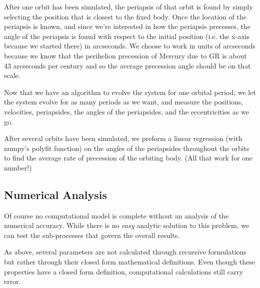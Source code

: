 \documentclass{report}
\begin{document}
            After one orbit has been simulated, the periapsis of that orbit is found by simply selecting the position that is closest to the fixed body.  Once the location of the periapsis is known, and since we're interested in how the periapsis precesses, the angle of the periapsis is found with respect to the initial position (i.e. the x-axis because we started there) in arcseconds.  We choose to work in units of arcseconds because we know that the perihelion precession of Mercury due to GR is about 43 arcseconds per century and so the average precession angle should be on that scale.
            
            Now that we have an algorithm to evolve the system for one orbital period, we let the system evolve for as many periods as we want, and measure the positions, velocities, periapsides, the angles of the periapsides, and the eccentricities as we go.
            
            After several orbits have been simulated, we preform a linear regression (with numpy's polyfit function) on the angles of the periapsides throughout the orbits to find the average rate of precession of the orbiting body. (All that work for one number!)

        \subsection{Numerical Analysis}

            Of course no computational model is complete without an analysis of the numerical accuracy.  While there is no \emph{easy} analytic solution to this problem, we can test the sub-processes that govern the overall results.
            
            As above, several parameters are not calculated through recursive formulations but rather through their closed form mathematical definitions.  Even though these properties have a closed form definition, computational calculations still carry error.
            
\end{document}
